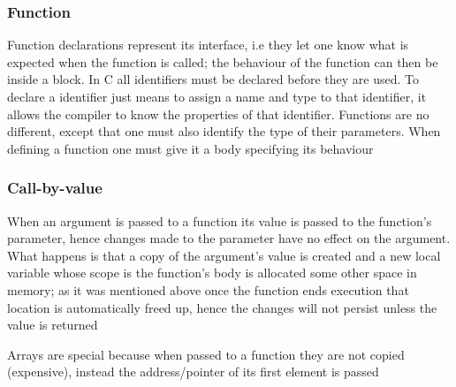 \subsubsection{Function}
\par{Function declarations represent its interface, i.e they let one know what is expected when
the function is called; the behaviour of the function can then be  inside a block. In C
all identifiers must be declared before they are used. To declare a identifier just means to
assign a name and type to that identifier, it allows the compiler to know the properties of that
identifier. Functions are no different, except that one must also identify the type of their
parameters. When defining a function one must give it a body specifying its behaviour}    


\subsubsection{Call-by-value}
\par{When an argument is passed to a function its value is passed to the function's parameter,
hence changes made to the parameter have no effect on the argument. What happens is that a copy of
the argument's value is created and a new local variable whose scope is the function's body is
allocated some other space in memory; as it was mentioned above once the function ends execution
that location is automatically freed up, hence the changes will not persist unless the value is
returned}
\par{Arrays are special because when passed to a function they are not copied (expensive),
instead the address/pointer of its first element is passed}

